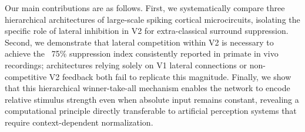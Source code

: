%

Our main contributions are as follows. First, we systematically compare three hierarchical architectures of large-scale spiking cortical microcircuits, isolating the specific role of lateral inhibition in V2 for extra-classical surround suppression. Second, we demonstrate that lateral competition within V2 is necessary to achieve the ~75\% suppression index consistently reported in primate in vivo recordings; architectures relying solely on V1 lateral connections or non-competitive V2 feedback both fail to replicate this magnitude. Finally, we show that this hierarchical winner-take-all mechanism enables the network to encode relative stimulus strength even when absolute input remains constant, revealing a computational principle directly transferable to artificial perception systems that require context-dependent normalization.

